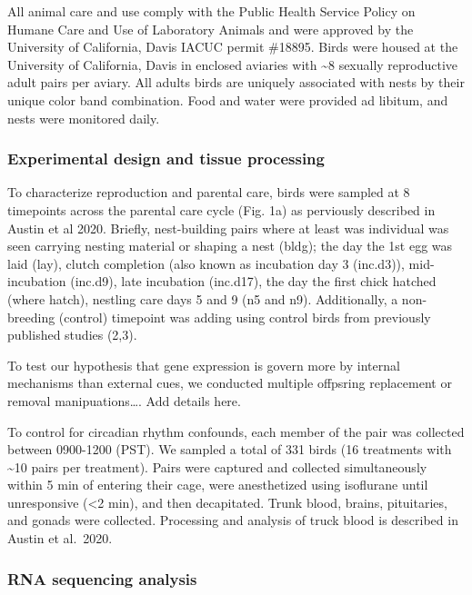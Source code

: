 All animal care and use comply with the Public Health Service Policy on
Humane Care and Use of Laboratory Animals and were approved by the
University of California, Davis IACUC permit \#18895. Birds were housed
at the University of California, Davis in enclosed aviaries with
\textasciitilde{}8 sexually reproductive adult pairs per aviary. All
adults birds are uniquely associated with nests by their unique color
band combination. Food and water were provided ad libitum, and nests
were monitored daily.

\hypertarget{experimental-design-and-tissue-processing}{%
\subsubsection{Experimental design and tissue
processing}\label{experimental-design-and-tissue-processing}}

To characterize reproduction and parental care, birds were sampled at 8
timepoints across the parental care cycle (Fig. 1a) as perviously
described in Austin et al 2020. Briefly, nest-building pairs where at
least was individual was seen carrying nesting material or shaping a
nest (bldg); the day the 1st egg was laid (lay), clutch completion (also
known as incubation day 3 (inc.d3)), mid-incubation (inc.d9), late
incubation (inc.d17), the day the first chick hatched (where hatch),
nestling care days 5 and 9 (n5 and n9). Additionally, a non-breeding
(control) timepoint was adding using control birds from previously
published studies (2,3).

To test our hypothesis that gene expression is govern more by internal
mechanisms than external cues, we conducted multiple offpsring
replacement or removal manipuations\ldots{}. Add details here.

To control for circadian rhythm confounds, each member of the pair was
collected between 0900-1200 (PST). We sampled a total of 331 birds (16
treatments with \textasciitilde{}10 pairs per treatment). Pairs were
captured and collected simultaneously within 5 min of entering their
cage, were anesthetized using isoflurane until unresponsive
(\textless{}2 min), and then decapitated. Trunk blood, brains,
pituitaries, and gonads were collected. Processing and analysis of truck
blood is described in Austin et al.~2020.

\hypertarget{rna-sequencing-analysis}{%
\subsubsection{RNA sequencing analysis}\label{rna-sequencing-analysis}}


